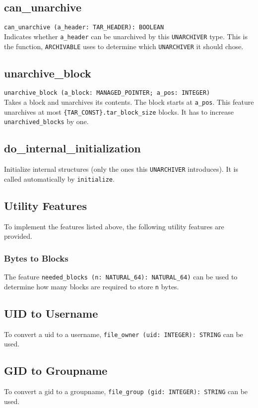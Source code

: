 \subsection{can\_unarchive}
\lstinline;can_unarchive (a_header: TAR_HEADER): BOOLEAN;\\
Indicates whether \lstinline;a_header; can be unarchived by this
\lstinline;UNARCHIVER; type. This is the function, \lstinline;ARCHIVABLE; uses
to determine which \lstinline;UNARCHIVER; it should chose.

\subsection{unarchive\_block}
\lstinline|unarchive_block (a_block: MANAGED_POINTER; a_pos: INTEGER)| \\
Takes a block and unarchives its contents. The block starts at
\lstinline;a_pos;. This feature unarchives at most
\lstinline;{TAR_CONST}.tar_block_size; blocks. It has to increase
\lstinline;unarchived_blocks; by one.

\subsection{do\_internal\_initialization}
Initialize internal structures (only the ones this \lstinline;UNARCHIVER;
introduces). It is called automatically by \lstinline;initialize;.

\subsection{Utility Features}
To implement the features listed above, the following utility features are
provided.

\subsubsection{Bytes to Blocks}
The feature \lstinline|needed_blocks (n: NATURAL_64): NATURAL_64)| can be used
to determine how many blocks are required to store \lstinline;n; bytes.

\subsection{UID to Username}
To convert a uid to a username, \lstinline|file_owner (uid: INTEGER): STRING|
can be used.

\subsection{GID to Groupname}
To convert a gid to a groupname, \lstinline|file_group (gid: INTEGER): STRING|
can be used.
